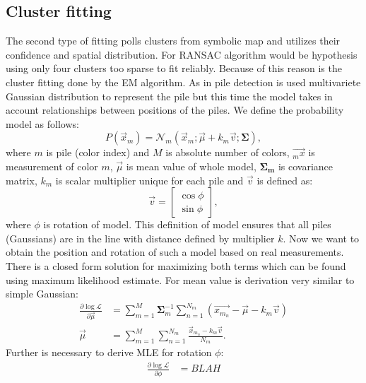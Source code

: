\subsection{Cluster fitting}
The second type of fitting polls clusters from symbolic map and utilizes their confidence and spatial distribution. For RANSAC algorithm would be hypothesis using only four clusters too sparse to fit reliably. Because of this reason is the cluster fitting done by the EM algorithm. As in pile detection is used multivariete Gaussian distribution to represent the pile but this time the model takes in account relationships between positions of the piles. We define the probability model as follows:
\begin{equation}
P(\vec{x}_m) = \mathcal{N}_m(\vec{x}_m; \vec{\mu} + k_m\vec{v}; \bm{\Sigma}),
\end{equation}
where $m$ is pile (color index) and $M$ is absolute number of colors, $\vec{_mx}$ is measurement of color $m$, $\vec{\mu}$ is mean value of whole model, $\bm{\Sigma_m}$ is covariance matrix, $k_m$ is scalar multiplier unique for each pile and $\vec{v}$ is defined as:
\begin{equation}
\vec{v} = \begin{bmatrix}
\cos \phi \\
\sin \phi
\end{bmatrix},
\end{equation}
where $\phi$ is rotation of model. This definition of model ensures that all piles (Gaussians) are in the line with distance defined by multiplier $k$. Now we want to obtain the position and rotation of such a model based on real measurements. There is a closed form solution for maximizing both terms which can be found using maximum likelihood estimate. For mean value is derivation very similar to simple Gaussian:
\begin{align}
\frac{\partial \log\mathcal{L} }{\partial \vec{\mu}} &= \sum_{m=1}^M \bm{\Sigma}^{-1}_m \sum_{n = 1}^{N_m} (\vec{x_{m_n}} - \vec{\mu} - k_m \vec{v}) \\
\vec{\mu} &= \sum_{m=1}^M \sum_{n = 1}^{N_m} \frac{\vec{x}_{m_n} - k_m \vec{v}}{N_m}.
\end{align}
Further is necessary to derive MLE for rotation $\phi$:
\begin{align}
\frac{\partial \log\mathcal{L} }{\partial \phi} &= BLAH
\end{align}

